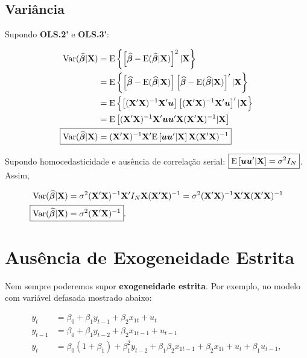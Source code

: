 \documentclass[11pt, oneside, a4paper, article]{article}
\numberwithin{equation}{section}
\begin{document}
\subsection{Variância} 
Supondo \textbf{OLS.2'} e \textbf{OLS.3'}:

\vspace{-1 em}
\begin{align*} 
\Var ( \widehat{\mbs{\beta}} | \Xmat) 
&= \E \left\{\left[ 
\widehat{\mbs{\beta}} - \E ( \widehat{\mbs{\beta}} | \Xmat )
\right]^2 | \Xmat \right\}
\\
&= \E \left\{ 
\left[ \widehat{\mbs{\beta}} - \E ( \widehat{\mbs{\beta}} | \Xmat ) \right]
\left[ \widehat{\mbs{\beta}} - \E ( \widehat{\mbs{\beta}} | \Xmat ) \right]'
| \Xmat \right\}
\\
&= \E \left\{ 
\left[ (\Xmat'\Xmat)^{-1}\Xmat' \mbs{u} \right]
\left[ (\Xmat'\Xmat)^{-1}\Xmat' \mbs{u} \right]'
| \Xmat \right\}
\\
&= \E \left[ (\Xmat'\Xmat)^{-1}\Xmat' \mbs{u} \mbs{u}' \Xmat (\Xmat'\Xmat)^{-1} | \Xmat \right]
\\
\Aboxed{
\Var ( \widehat{\mbs{\beta}} | \Xmat) 
&= 
(\Xmat'\Xmat)^{-1}\Xmat' 
\E \left[ \mbs{u} \mbs{u}'| \Xmat \right]
\Xmat (\Xmat'\Xmat)^{-1} }
\end{align*}

Supondo homocedasticidade e ausência de correlação serial: 
$\boxed{ \text{E} \left[ \boldsymbol{u} \boldsymbol{u}'| \mathbf{X} \right] = \sigma^2 I_{N} }$.
Assim, 

\vspace{-1 em}
\begin{align*} 
\Var ( \widehat{\mbs{\beta}} | \Xmat) 
&= \sigma^2 (\Xmat'\Xmat)^{-1}\Xmat' I_{N} \Xmat (\Xmat'\Xmat)^{-1}
= \sigma^2 (\Xmat'\Xmat)^{-1}\Xmat'\Xmat (\Xmat'\Xmat)^{-1}
\\
\Aboxed{ \Var ( \widehat{\mbs{\beta}} | \Xmat) &= \sigma^2 (\Xmat'\Xmat)^{-1} }.
\end{align*}

\clearpage
\section{Ausência de Exogeneidade Estrita}
Nem sempre poderemos supor \textbf{exogeneidade estrita}.
Por exemplo, no modelo com variável defasada mostrado abaixo:

\vspace{-1 em}
\begin{align*}
y_{t} &= \beta_{0} + \beta_{1} y_{t-1} + \beta_{2} x_{1t} + u_{t}
\\
y_{t-1} &= \beta_{0} + \beta_{1} y_{t-2} + \beta_{2} x_{1t-1} + u_{t-1}
\\
y_{t} &=
\beta_{0}(1 + \beta_{1})
+
\beta_{1}^2 y_{t-2}
+
\beta_{1} 
\beta_{2} x_{1t-1} 
+
\beta_{2} x_{1t} 
+
u_{t}
+
\beta_{1} u_{t-1},
\end{align*}
\end{document}
